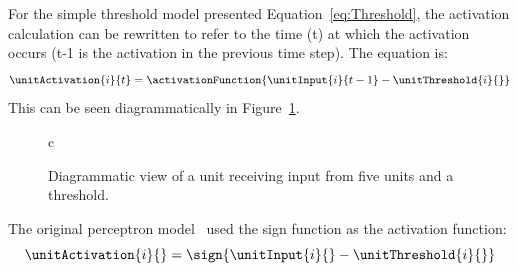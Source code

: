 For the simple threshold model presented Equation~\eqref{eq:Threshold}, the activation calculation can be rewritten to refer to the time (t) at which the activation occurs (t-1 is the activation in the previous time step).  The equation is:
\begin{equation}
    \label{eq:unitActivation}
    \unitActivation{i}{t} =\activationFunction{\unitInput{i}{t-1} -\unitThreshold{i}{}}
\end{equation}
This can be seen diagrammatically in Figure~\ref{fig:unitDiagram}.
\begin{figure}
  \begin{center}
%        
\begin{tabular}{c}
\end{tabular}        
        \caption{Diagrammatic view of a unit receiving input from five units and a threshold.}
        \label{fig:unitDiagram}
  \end{center}
\end{figure}

The original perceptron model~\citep{Rosenblatt1958} used the sign function as the activation function: \begin{equation}
    \label{eq:signFunction}
        \unitActivation{i}{} = \sign{\unitInput{i}{}-\unitThreshold{i}{}}
\end{equation}

